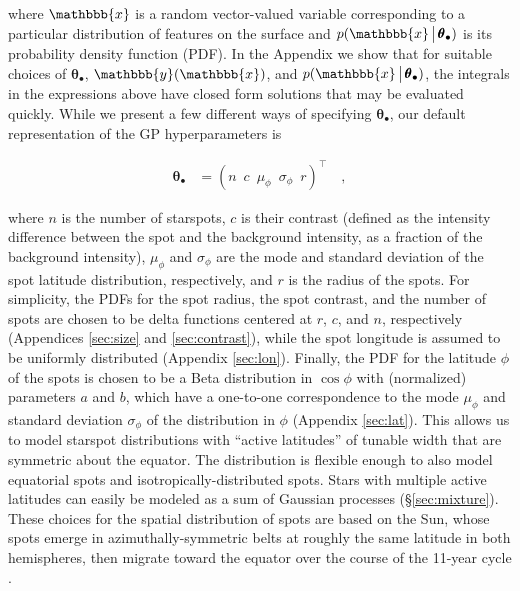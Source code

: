 \documentclass[modern,linenumbers]{aastex62}
\begin{document}
%
where $\mathbbb{x}$ is a random vector-valued variable corresponding to a particular
distribution of features on the surface
and $p(\mathbbb{x} \, \big| \, \pmb{\theta}_\bullet)$ is its probability density
function (PDF).
%
In the Appendix we show that for suitable choices of $\pmb{\theta}_\bullet$,
$\mathbbb{y}(\mathbbb{x})$,
and $p(\mathbbb{x} \, \big| \, \pmb{\theta}_\bullet)$, the integrals in the expressions
above have closed form solutions that may be evaluated quickly.
%
While we present a few different ways of specifying $\pmb{\theta}_\bullet$,
our default representation of the GP hyperparameters is
%
\begin{linenomath}\begin{align}
        \label{eq:thetaspot}
        \pmb{\theta}_\bullet
         & =
        \left(
        n
        \,\,\,
        c
        \,\,\,
        \mu_\phi
        \,\,\,
        \sigma_\phi
        \,\,\,
        r
        \right)^\top
        \quad,
    \end{align}\end{linenomath}
%
where $n$ is the number of starspots, $c$ is their contrast
(defined as the intensity difference between the spot and the
background intensity, as a fraction of the background intensity),
$\mu_\phi$ and $\sigma_\phi$ are the mode and standard deviation
of the spot latitude distribution, respectively, and $r$ is the radius
of the spots.
%
For simplicity, the PDFs for the spot radius, the spot contrast, and the number
of spots are chosen to be delta functions centered at $r$, $c$, and $n$, respectively
(Appendices \ref{sec:size} and \ref{sec:contrast}),
while
the spot longitude is assumed to be uniformly distributed
(Appendix \ref{sec:lon}).
%
Finally,
the PDF for the latitude $\phi$ of the spots is chosen to be a Beta distribution in
$\cos\phi$ with (normalized) parameters $a$ and $b$,
which have a one-to-one correspondence to the mode $\mu_\phi$ and
standard deviation $\sigma_\phi$ of the distribution in $\phi$
(Appendix \ref{sec:lat}). This allows us to model starspot distributions
with ``active latitudes'' of tunable width that are symmetric about
the equator. The distribution is flexible enough to also model equatorial
spots and isotropically-distributed spots. Stars with multiple active
latitudes can easily be modeled as a sum of Gaussian processes
(\S\ref{sec:mixture}). These choices for the spatial distribution of
spots are based on the Sun, whose spots emerge in azimuthally-symmetric
belts at roughly the same latitude in both hemispheres, then
migrate toward the equator over the course of the 11-year cycle
\citep{Solanki2006}.
\end{document}
